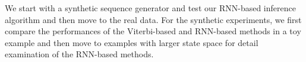 \documentclass[conference]{IEEEtran}
\begin{document}
	
	
	
	We start with a synthetic sequence generator and test our RNN-based inference algorithm and then move to the real data. 
	For the synthetic experiments, we first compare the performances of the Viterbi-based and RNN-based methods in a toy example and then move to examples with larger state space for detail examination of the RNN-based methods. 
	
\end{document}
